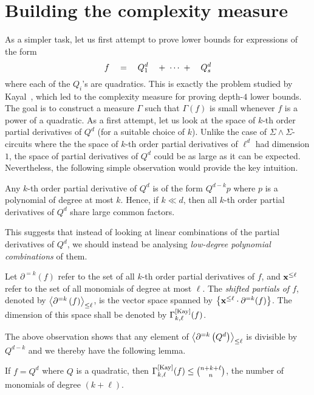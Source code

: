 \section{Building the complexity measure}

As a simpler task, let us first attempt to prove lower bounds for expressions of the form
$$
f \quad = \quad Q_1^{d} \quad + \;\cdots\; +  \quad Q_s^{d}
$$
where each of the $Q_i$'s are quadratics. This is exactly the problem studied by Kayal~\cite{k2}, which led to the complexity measure for proving depth-$4$ lower bounds. \\

The goal is to construct a measure $\Gamma$ such that $\Gamma(f)$ is small whenever $f$ is a power of a quadratic. As a first attempt, let us look at the space of $k$-th order partial derivatives of $Q^d$ (for a suitable choice of $k$). Unlike the case of $\Sigma\!\wedge\!\Sigma$-circuits where the the space of $k$-th order partial derivatives of $\ell^d$ had dimension $1$, the space of partial derivatives of $Q^{d}$ could be as large as it can be expected. Nevertheless, the following simple observation would provide the key intuition.

\begin{observation} 
  Any $k$-th order partial derivative of $Q^d$ is of the form $Q^{d-k}p$ where $p$ is a polynomial of degree at most $k$. Hence, if $k \ll d$, then all $k$-th order partial derivatives of $Q^d$ share large common factors.
\end{observation}

This suggests that instead of looking at linear combinations of the partial derivatives of $Q^d$, we should instead be analysing \emph{low-degree polynomial combinations} of them. 
\begin{definition}\label{defn:shifted-partials}
  Let $\partial^{=k}(f)$ refer to the set of all $k$-th order partial derivatives of $f$, and $\mathbf{x}^{\leq \ell}$ refer to the set of all monomials of degree at most $\ell$. The \emph{shifted partials of $f$}, denoted by $\left\langle\partial^{=k}\left(f\right)\right\rangle_{\leq \ell}$, is the vector space spanned by $\left\{\mathbf{x}^{\leq \ell} \cdot \partial^{=k}(f)\right\}$. The dimension of this space shall be denoted by $\Gamma^{\mathrm{[Kay]}}_{k,\ell}(f)$. 
\end{definition}

The above observation shows that any element of $\left\langle\partial^{=k}\left(Q^d\right)\right\rangle_{\leq \ell}$ is divisible by $Q^{d-k}$ and we thereby have the following lemma. 

\begin{lemma}
  If $f = Q^d$ where $Q$ is a quadratic, then $\Gamma^{\mathrm{[Kay]}}_{k,\ell}(f)\leq \binom{n + k + \ell}{n}$, the number of monomials of degree $(k + \ell)$. 
\end{lemma}

